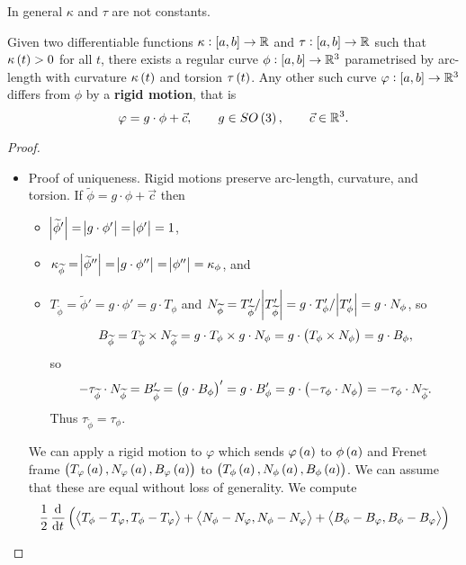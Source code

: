 In general $ \kappa $ and $ \tau $ are not constants.


\begin{theorem}
Given two differentiable functions $ \kappa : \sbr{a, b} \to \R $ and $ \tau : \sbr{a, b} \to \R $ such that $ \kappa\br{t} > 0 $ for all $ t $, there exists a regular curve $ \phi : \sbr{a, b} \to \R^3 $ parametrised by arc-length with curvature $ \kappa\br{t} $ and torsion $ \tau\br{t} $. Any other such curve $ \varphi : \sbr{a, b} \to \R^3 $ differs from $ \phi $ by a \textbf{rigid motion}, that is
$$ \varphi = g \cdot \phi + \vec{c}, \qquad g \in SO\br{3}, \qquad \vec{c} \in \R^3. $$
\end{theorem}

\begin{proof}
\hfill
\begin{itemize}
\item Proof of uniqueness. Rigid motions preserve arc-length, curvature, and torsion. If $ \widetilde{\phi} = g \cdot \phi + \vec{c} $ then
\begin{itemize}
\item $ \abs{\widetilde{\phi}'} = \abs{g \cdot \phi'} = \abs{\phi'} = 1 $,
\item $ \kappa_{\widetilde{\phi}} = \abs{\widetilde{\phi}''} = \abs{g \cdot \phi''} = \abs{\phi''} = \kappa_\phi $, and
\item $ T_{\widetilde{\phi}} = \widetilde{\phi}' = g \cdot \phi' = g \cdot T_\phi $ and $ N_{\widetilde{\phi}} = T_{\widetilde{\phi}}' / \abs{T_{\widetilde{\phi}}'} = g \cdot T_\phi' / \abs{T_\phi'} = g \cdot N_\phi $, so
$$ B_{\widetilde{\phi}} = T_{\widetilde{\phi}} \times N_{\widetilde{\phi}} = g \cdot T_\phi \times g \cdot N_\phi = g \cdot \br{T_\phi \times N_\phi} = g \cdot B_\phi, $$
so
$$ -\tau_{\widetilde{\phi}} \cdot N_{\widetilde{\phi}} = B_{\widetilde{\phi}}' = \br{g \cdot B_\phi}' = g \cdot B_\phi' = g \cdot \br{-\tau_\phi \cdot N_\phi} = -\tau_\phi \cdot N_{\widetilde{\phi}}. $$
Thus $ \tau_{\widetilde{\phi}} = \tau_\phi $.
\end{itemize}
We can apply a rigid motion to $ \varphi $ which sends $ \varphi\br{a} $ to $ \phi\br{a} $ and Frenet frame $ \br{T_\varphi\br{a}, N_\varphi\br{a}, B_\varphi\br{a}} $ to $ \br{T_\phi\br{a}, N_\phi\br{a}, B_\phi\br{a}} $. We can assume that these are equal without loss of generality. We compute
\begin{align*}
& \dfrac{1}{2}\dod{}{t}\br{\abr{T_\phi - T_\varphi, T_\phi - T_\varphi} + \abr{N_\phi - N_\varphi, N_\phi - N_\varphi} + \abr{B_\phi - B_\varphi, B_\phi - B_\varphi}} \\

\end{align*}
\end{itemize}
\end{proof}
